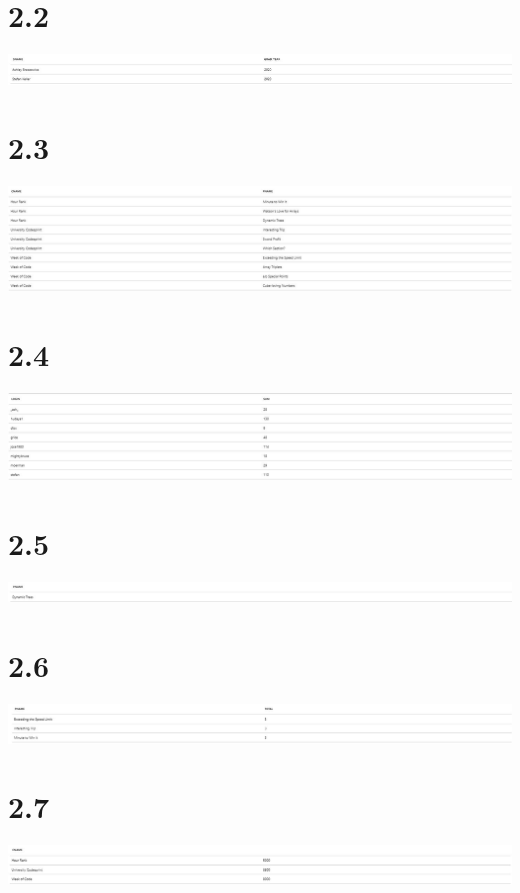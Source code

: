 \documentclass{article}
\begin{document}
\section{2.2}
\includegraphics[width=\textwidth]{img/query-outputs/2_2.JPG}
\section{2.3}
\includegraphics[width=\textwidth]{img/query-outputs/2_3.JPG}
\section{2.4}
\includegraphics[width=\textwidth]{img/query-outputs/2_4.JPG}
\section{2.5}
\includegraphics[width=\textwidth]{img/query-outputs/2_5.JPG}
\section{2.6}
\includegraphics[width=\textwidth]{img/query-outputs/2_6.JPG}
\section{2.7}
\includegraphics[width=\textwidth]{img/query-outputs/2_7.JPG}
\end{document}
